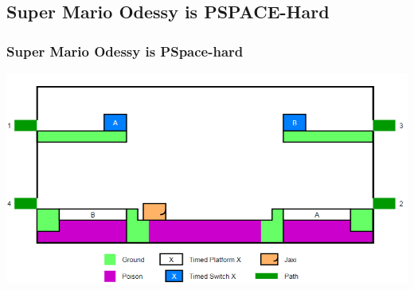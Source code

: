 \documentclass{beamer}
\begin{document}
\subsection{Super Mario Odessy is PSPACE-Hard}
\begin{frame}
  \frametitle{Super Mario Odessy is PSpace-hard}
  \includegraphics[width=1\textwidth]{res/Super Mario Odyssey.png}
\end{frame}
\end{document}
